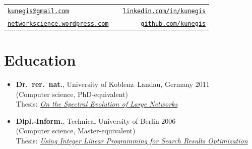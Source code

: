 \documentclass[line,mm]{res}
\newcounter{x}
\newcounter{y}
\newcounter{z}
\begin{document}
\begin{resume}

\hspace{0.61cm}
\begin{tabular}{lcr}
  {\tt \href{mailto:kunegis@gmail.com}{kunegis@gmail.com}} &\hspace{2.05cm}\hfill &{\tt \href{http://www.linkedin.com/in/kunegis}{linkedin.com/in/kunegis}} \\
  {\tt \href{http://networkscience.wordpress.com/}{networkscience.wordpress.com}} && {\tt \href{https://github.com/kunegis}{github.com/kunegis}} 
\end{tabular}

\vspace{0.1cm}

\section{Education}

\begin{itemize}

\item[{[E1]}]
\textbf{Dr.\ rer.\ nat.}, University of Koblenz--Landau, Germany \hfill 2011 \\
(Computer science, PhD-equivalent) \\
Thesis: \emph{\href{https://kola.opus.hbz-nrw.de/frontdoor/index/index/docId/581}{On
       the Spectral Evolution of Large Networks}}

\item[{[E2]}]
\textbf{Dipl.-Inform.}, Technical University of Berlin \hfill 2006 \\
(Computer science, Master-equivalent) \\
Thesis: \emph{\href{https://pdfs.semanticscholar.org/42ca/e9b00864ee09bc9bc92ef3d411e20b966a8d.pdf}{Using Integer Linear Programming for Search Results Optimization}}


\end{itemize}
\end{resume}
\end{document}
